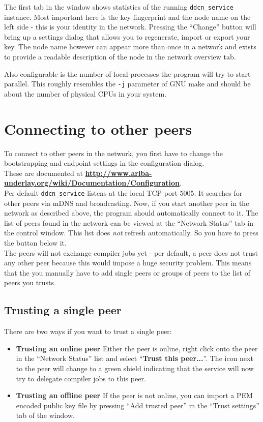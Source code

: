 \documentclass[a4paper,9pt]{scrartcl}
\begin{document}
The first tab in the window shows statistics of the running \texttt{ddcn\_service} instance. Most important here is the key fingerprint and the node name on the left side - this is your identity in the network. Pressing the ``Change'' button will bring up a settings dialog that allows you to regenerate, import or export your key. The node name however can appear more than once in a network and exists to provide a readable description of the node in the network overview tab.\\
\smallskip

Also configurable is the number of local processes the program will try to start parallel. This roughly resembles the \texttt{-j} parameter of GNU make and should be about the number of physical CPUs in your system.

\section{Connecting to other peers}

To connect to other peers in the network, you first have to change the bootstrapping and endpoint settings in the configuration dialog.\\These are documented at \textbf{\url{http://www.ariba-underlay.org/wiki/Documentation/Configuration}}.\\Per default \texttt{ddcn\_service} listens at the local TCP port 5005. It searches for other peers via mDNS and broadcasting. Now, if you start another peer in the network as described above, the program should automatically connect to it. The list of peers found in the network can be viewed at the ``Network Status'' tab in the control window. This list does \textit{not} refresh automatically. So you have to press the button below it.\\
The peers will not exchange compiler jobs yet - per default, a peer does not trust any other peer because this would impose a huge security problem. This means that the you manually have to add single peers or groups of peers to the list of peers you trusts.

\subsection{Trusting a single peer}
There are two ways if you want to trust a single peer:
\begin{itemize}
  \item{\bf Trusting an online peer} Either the peer is online, right click onto the peer in the ``Network Status'' list and select ``\textbf{Trust this peer...}''. The icon next to the peer will change to a green shield indicating that the service will now try to delegate compiler jobs to this peer.
  \item{\bf Trusting an offline peer} If the peer is not online, you can import a PEM encoded public key file by pressing ``Add trusted peer'' in the ``Trust settings'' tab of the window.
\end{itemize}
\end{document}
